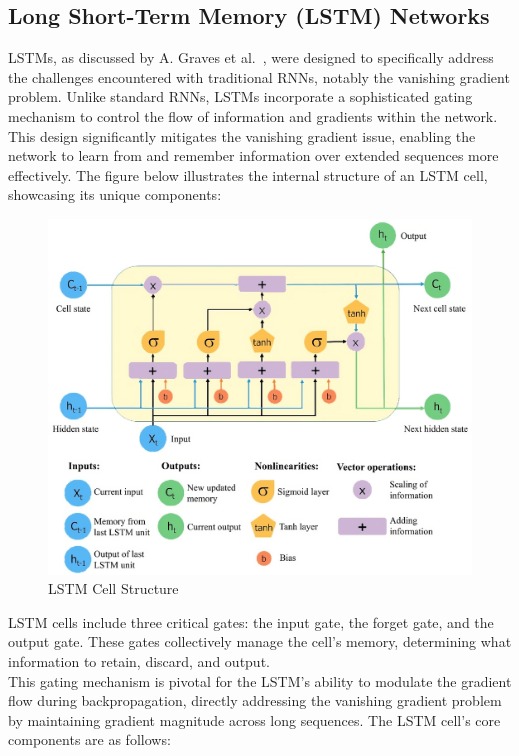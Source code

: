 \subsection{Long Short-Term Memory (LSTM) Networks}

LSTMs, as discussed by A. Graves et al.~\cite{graves2012long}, were designed to specifically address the challenges encountered with traditional RNNs, notably the vanishing gradient problem. 
Unlike standard RNNs, LSTMs incorporate a sophisticated gating mechanism to control the flow of information and gradients within the network.\\
This design significantly mitigates the vanishing gradient issue, enabling the network to learn from and remember information over extended sequences more effectively.
\newpage
The figure below illustrates the internal structure of an LSTM cell, showcasing its unique components:

\begin{figure}[ht]
  \centering
  \includegraphics[scale=0.2]{Figures/Chapter4/lstm_schematic_improved-transformed.png}
  \caption[LSTM Cell Structure]{LSTM Cell Structure}
  \label{fig:LSTM Cell Structure}
    
\end{figure}

LSTM cells include three critical gates: the input gate, the forget gate, and the output gate. 
These gates collectively manage the cell's memory, determining what information to retain, discard, and output. \\
This gating mechanism is pivotal for the LSTM's ability to modulate the gradient flow during backpropagation, directly addressing the vanishing gradient problem by maintaining gradient magnitude across long sequences.
The LSTM cell's core components are as follows:

